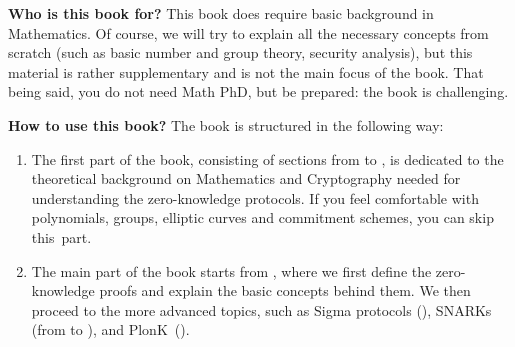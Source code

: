 \documentclass[lecture-notes.tex]{subfiles}
\begin{document}
\textbf{Who is this book for?} This book does require basic background in
Mathematics. Of course, we will try to explain all the necessary concepts from
scratch (such as basic number and group theory, security analysis), but this
material is rather supplementary and is not the main focus of the book. That
being said, you do not need Math PhD, but be prepared: the book is challenging.

\textbf{How to use this book?} The book is structured in the following way:
\begin{enumerate}[left=0mm]
    \item The first part of the book, consisting of sections from
     to , is dedicated to
    the theoretical background on Mathematics and Cryptography needed for
    understanding the zero-knowledge protocols. If you feel comfortable with
    polynomials, groups, elliptic curves and commitment schemes, you can skip
    this~part.
    \item The main part of the book starts from , where 
    we first define the zero-knowledge proofs and explain the basic concepts
    behind them. We then proceed to the more advanced topics, such as Sigma
    protocols (), SNARKs (from 
    to ), and PlonK~().
\end{enumerate}
\end{document}

